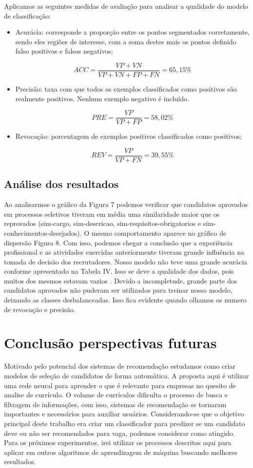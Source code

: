\documentclass[conference]{IEEEtran}
\begin{document}
Aplicamos as seguintes medidas  de avaliação para analisar a qualidade do modelo de classificação:
\begin{itemize}
\item Acurácia: corresponde a proporção entre os pontos segmentados corretamente, sendo eles regiões de interesse, com a soma destes mais os pontos definido falso positivos e falsos negativos;

     \[ACC = \frac{VP + VN}{VP+VN+FP+FN} = 65,15\%\]

\item Precisão: taxa com que todos os exemplos classificados como positivos são realmente positivos. Nenhum exemplo negativo é incluído.

    \[PRE = \frac{VP}{VP+FP} = 58,02\%\]

\item  Revocação: porcentagem de exemplos positivos classificados como positivos;

    \[REV = \frac{VP}{VP+FN} = 39,55\%\]
\end{itemize}

    
    \subsection{Análise dos resultados}

	 Ao analisarmos o gráfico da Figura 7 podemos verificar que candidatos aprovados em processos seletivos tiveram em média uma similaridade maior que os reprovados (sim-cargo, sim-descricao, sim-requisitos-obrigatorios e sim-conhecimentos-desejados). 
     O mesmo comportamento aparece no gráfico de dispersão Figura 8. Com isso, podemos chegar a conclusão que a experiência profissional e as atividades exercidas anteriormente tiveram grande influência na tomada de decisão dos recrutadores.
     Nosso modelo não teve uma grande acurácia conforme apresentado na Tabela IV. Isso se deve a qualidade dos dados, pois muitos dos mesmos estavam vazios . Devido a incompletude, grande parte dos candidatos aprovados não puderam ser utilizados para treinar nosso modelo, deixando as classes desbalanceadas. Isso fica evidente quando olhamos os numero de revocação e precisão.
	   
\section*{Conclusão perspectivas futuras}

    Motivado pelo potencial dos sistemas de recomendação estudamos como criar modelos de seleção de candidatos de forma automática. A proposta aqui é utilizar uma rede neural para aprender o que é relevante para empresas no quesito de analise de currículo.
    O volume de currículos dificulta o processo de busca e filtragem de informações, com isso, sistemas de recomendação se tornaram importantes e necessários para auxiliar usuários.
    Considerando-se que o objetivo principal deste trabalho era criar um classificador para predizer se um candidato deve ou não ser recomendados para vaga, podemos considerar como atingido.
    Para os próximos experimentos, irei utilizar os processos descritos aqui para aplicar em outros algoritmos de aprendizagem de máquina buscando melhores resultados.
\end{document}
